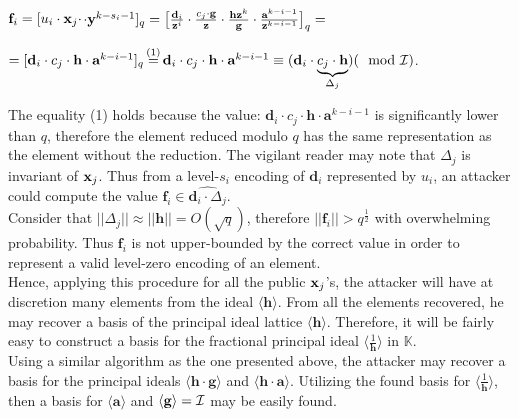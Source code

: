 \begin{center}
	$\textbf{f}_i = [u_i \cdot \textbf{x}_j \cdot$\pzt$\cdot \textbf{y}^{k - s_i - 1}]_q = \big[ \frac{\textbf{d}_i}{\textbf{z}^i} \cdot \frac{c_j \cdot \textbf{g}}{\textbf{z}} \cdot \frac{\textbf{h}\textbf{z}^k}{\textbf{g}} \cdot \frac{\textbf{a}^{k- i - 1}}{\textbf{z}^{k-i-1}}\big]_q=$
	
\end{center}
	
\begin{center}
	$= [\textbf{d}_i \cdot c_j \cdot \textbf{h} \cdot \textbf{a}^{k-i-1}]_q \stackrel{\mathclap{\normalfont\mbox{\scriptsize{(1)}}}}{=} \textbf{d}_i \cdot c_j \cdot \textbf{h} \cdot \textbf{a}^{k-i-1} \equiv (\textbf{d}_i \cdot \underbrace{c_j \cdot \textbf{h} }_{\Delta_j} )   (\mod \id)$.

\end{center}

The equality (1) holds because the value: $\textbf{d}_i \cdot c_j \cdot \textbf{h} \cdot \textbf{a}^{k-i-1}$ is significantly lower than $q$, therefore the element reduced modulo $q$ has the same representation as the element without the reduction. The vigilant reader may note that $\Delta_j$ is invariant of $\textbf{x}_j$. Thus from a level-$s_i$ encoding of $\textbf{d}_i$ represented by $u_i$, an attacker could compute the value $\textbf{f}_i \in \widehat{\textbf{d}_i \cdot\Delta_j}$.\\

Consider that $||\Delta_j|| \approx ||\textbf{h} || =  O(\sqrt{q})$, therefore $||\textbf{f}_i||> q^{\frac{1}{2}}$ with overwhelming probability. Thus $\textbf{f}_i $ is not upper-bounded by the correct value in order to represent a valid level-zero encoding of an element.\\

Hence, applying this procedure for all the public $\textbf{x}_j$'s, the attacker will have at discretion many elements from the ideal $\langle \textbf{h} \rangle$. From all the elements recovered, he may recover a basis of the principal ideal lattice $\langle \textbf{h} \rangle$. Therefore, it will be fairly easy to construct a basis for the fractional principal ideal $\big\langle\frac{1}{\textbf{h}} \big \rangle$ in $\mathbb{K}$.\\

Using a similar algorithm as the one presented above, the attacker may recover a basis for the principal ideals $\langle\textbf{h} \cdot \textbf{g} \rangle$ and $\langle \textbf{h} \cdot \textbf{a} \rangle$. Utilizing the found basis for $\big\langle\frac{1}{\textbf{h}} \big \rangle$, then a basis for $\langle \textbf{a} \rangle$ and $\langle \textbf{g} \rangle = \mathcal{I}$ may be easily found.\\

